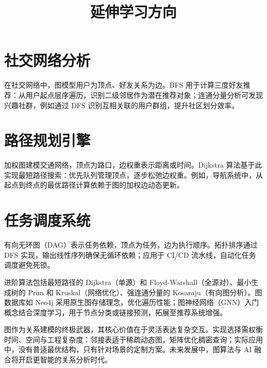 \chapter{社交网络分析}
在社交网络中，图模型用户为顶点、好友关系为边。BFS 用于计算三度好友推荐：从用户起点层序遍历，识别二级邻居作为潜在推荐对象；连通分量分析可发现兴趣社群，例如通过 DFS 识别互相关联的用户群组，提升社区划分效率。\par
\chapter{路径规划引擎}
加权图建模交通网络，顶点为路口，边权重表示距离或时间。Dijkstra 算法基于此实现最短路径搜索：优先队列管理顶点，逐步松弛边权重。例如，导航系统中，从起点到终点的最优路径计算依赖于图的加权边动态更新。\par
\chapter{任务调度系统}
有向无环图（DAG）表示任务依赖，顶点为任务，边为执行顺序。拓扑排序通过 DFS 实现，输出线性序列确保无循环依赖；应用于 CI/CD 流水线，自动化任务调度避免死锁。\par
\title{延伸学习方向}
进阶算法包括最短路径的 Dijkstra（单源）和 Floyd-Warshall（全源对）、最小生成树的 Prim 和 Kruskal（网络优化）、强连通分量的 Kosaraju（有向图分析）。图数据库如 Neo4j 采用原生图存储理念，优化遍历性能；图神经网络（GNN）入门概念结合深度学习，用于节点分类或链接预测，拓展至推荐系统增强。\par
图作为关系建模的终极武器，其核心价值在于灵活表达复杂交互。实现选择需权衡时间、空间与工程复杂度：邻接表适于稀疏动态图，矩阵优化稠密查询；实际应用中，没有普适最优结构，只有针对场景的定制方案。未来发展中，图算法与 AI 融合将开启更智能的关系分析时代。\par

